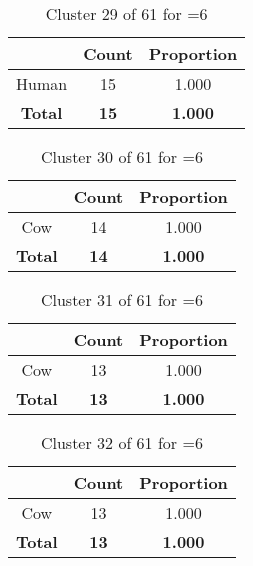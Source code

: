 \begin{table}[ht!]
\centering
\begin{tabular}{|c|c|c|}
\hline
\bf \Spec{} &\bf Count &\bf Proportion\\ \hline \hline
Human & 15 & 1.000\\ \hline
\hline
\bf Total & \bf 15 & \bf 1.000\\ \hline
\end{tabular}
\label{tab:cluster:29:6}
\caption{Cluster 29 of 61 for \minneigh{}=6}
\end{table}

\clearpage
\begin{table}[ht!]
\centering
\begin{tabular}{|c|c|c|}
\hline
\bf \Spec{} &\bf Count &\bf Proportion\\ \hline \hline
Cow & 14 & 1.000\\ \hline
\hline
\bf Total & \bf 14 & \bf 1.000\\ \hline
\end{tabular}
\label{tab:cluster:30:6}
\caption{Cluster 30 of 61 for \minneigh{}=6}
\end{table}

\begin{table}[ht!]
\centering
\begin{tabular}{|c|c|c|}
\hline
\bf \Spec{} &\bf Count &\bf Proportion\\ \hline \hline
Cow & 13 & 1.000\\ \hline
\hline
\bf Total & \bf 13 & \bf 1.000\\ \hline
\end{tabular}
\label{tab:cluster:31:6}
\caption{Cluster 31 of 61 for \minneigh{}=6}
\end{table}

\begin{table}[ht!]
\centering
\begin{tabular}{|c|c|c|}
\hline
\bf \Spec{} &\bf Count &\bf Proportion\\ \hline \hline
Cow & 13 & 1.000\\ \hline
\hline
\bf Total & \bf 13 & \bf 1.000\\ \hline
\end{tabular}
\label{tab:cluster:32:6}
\caption{Cluster 32 of 61 for \minneigh{}=6}
\end{table}

